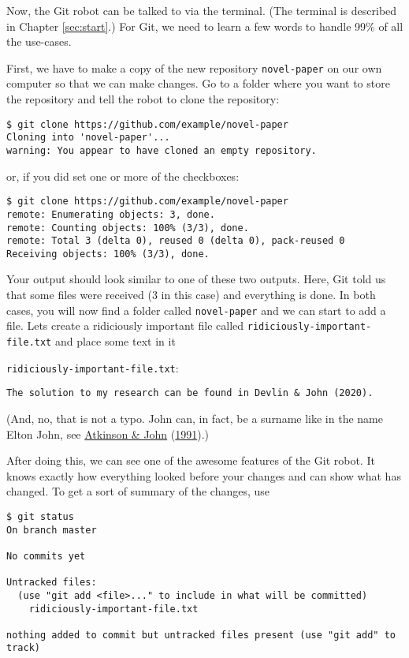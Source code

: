 \documentclass[
  14pt
  american,
  paper=a4,
  ,captions=tableheading
]{scrbook}
\newcommand{\passthrough}[1]{#1}
\begin{document}
Now, the Git robot can be talked to via the terminal. (The terminal is
described in Chapter \ref{sec:start}.) For Git, we need to learn a few
words to handle 99\% of all the use-cases.

First, we have to make a copy of the new repository
\passthrough{\lstinline!novel-paper!} on our own computer so that we can
make changes. Go to a folder where you want to store the repository and
tell the robot to clone the repository:

\begin{lstlisting}
$ git clone https://github.com/example/novel-paper
Cloning into 'novel-paper'...
warning: You appear to have cloned an empty repository.
\end{lstlisting}

or, if you did set one or more of the checkboxes:

\begin{lstlisting}
$ git clone https://github.com/example/novel-paper
remote: Enumerating objects: 3, done.
remote: Counting objects: 100% (3/3), done.
remote: Total 3 (delta 0), reused 0 (delta 0), pack-reused 0
Receiving objects: 100% (3/3), done.
\end{lstlisting}

Your output should look similar to one of these two outputs. Here, Git
told us that some files were received (3 in this case) and everything is
done. In both cases, you will now find a folder called
\passthrough{\lstinline!novel-paper!} and we can start to add a file.
Lets create a ridiciously important file called
\passthrough{\lstinline!ridiciously-important-file.txt!} and place some
text in it

\passthrough{\lstinline!ridiciously-important-file.txt!}:

\begin{lstlisting}
The solution to my research can be found in Devlin & John (2020).
\end{lstlisting}

(And, no, that is not a typo. John can, in fact, be a surname like in
the name Elton John, see \protect\hyperlink{ref-atkinson1991}{Atkinson
\& John} (\protect\hyperlink{ref-atkinson1991}{1991}).)

After doing this, we can see one of the awesome features of the Git
robot. It knows exactly how everything looked before your changes and
can show what has changed. To get a sort of summary of the changes, use

\begin{lstlisting}
$ git status
On branch master

No commits yet

Untracked files:
  (use "git add <file>..." to include in what will be committed)
    ridiciously-important-file.txt

nothing added to commit but untracked files present (use "git add" to track)
\end{lstlisting}
\end{document}
